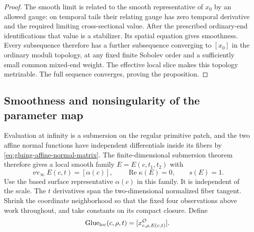 \documentclass[11pt]{amsart}
\theoremstyle{definition}
\theoremstyle{remark}
\theoremstyle{plain}
\newcommand{\Glue}{\operatorname{Glue}}
\begin{document}
\begin{proof}
The smooth limit is related to the smooth representative of $x_0$
by an allowed gauge: on temporal tails their relating gauge has zero
temporal derivative and the required limiting cross-sectional value.
After the prescribed ordinary-end identifications that value is a
stabilizer. Its spatial equation gives smoothness. Every subsequence
therefore has a further subsequence converging to $[x_0]$ in
the ordinary moduli topology, at any fixed finite Sobolev order and
a sufficiently small common mixed-end weight. The effective local
slice makes this topology metrizable. The full sequence converges,
proving the proposition.
\end{proof}

\subsection{Smoothness and nonsingularity of the parameter map}

Evaluation at infinity is a submersion on the regular primitive patch,
and the two affine normal functions have independent differentials
inside its fibers by \eqref{eq:gluing-affine-normal-matrix}.
The finite-dimensional submersion theorem therefore gives a local
smooth family $E=E(c,t_1,t_2)$ with
\[
          \operatorname{ev}_\infty E(c,t)=[\alpha(c)],\qquad
                   \operatorname{Re}\kappa(E)=0,\qquad s(E)=1.
\]
Use the based surface representative $\alpha(c)$ in this family.
It is independent of the scale. The $t$ derivatives span the
two-dimensional normalized fiber tangent. Shrink the coordinate
neighborhood so that the fixed four observations above work throughout,
and take constants on its compact closure. Define
\begin{equation}\label{eq:gluing-local-parameter-map}
       \Glue_{\rm loc}(c,\rho,t)
                  =[x^{\mathcal O}_{c,\rho,E(c,t)}].
\end{equation}
\end{document}

